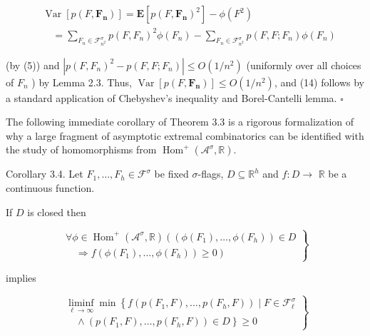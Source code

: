\documentclass[10pt]{article}
\begin{document}
$$
\begin{aligned}
& \operatorname{Var}\left[p\left(F, \boldsymbol{F}_{\boldsymbol{n}}\right)\right]=\mathbf{E}\left[p\left(F, \boldsymbol{F}_{\boldsymbol{n}}\right)^{2}\right]-\phi\left(F^{2}\right) \\
& \quad=\sum_{F_{n} \in \mathcal{F}_{n^{2}}^{\sigma}} p\left(F, F_{n}\right)^{2} \phi\left(F_{n}\right)-\sum_{F_{n} \in \mathcal{F}_{n^{2}}^{\sigma}} p\left(F, F ; F_{n}\right) \phi\left(F_{n}\right)
\end{aligned}
$$

(by (5)) and $\left|p\left(F, F_{n}\right)^{2}-p\left(F, F ; F_{n}\right)\right| \leq O\left(1 / n^{2}\right)$ (uniformly over all choices of $F_{n}$ ) by Lemma 2.3. Thus, $\operatorname{Var}\left[p\left(F, \boldsymbol{F}_{\boldsymbol{n}}\right)\right] \leq O\left(1 / n^{2}\right)$, and (14) follows by a standard application of Chebyshev's inequality and Borel-Cantelli lemma. \(\square\)

The following immediate corollary of Theorem 3.3 is a rigorous formalization of why a large fragment of asymptotic extremal combinatorics can be identified with the study of homomorphisms from $\operatorname{Hom}^{+}\left(\mathcal{A}^{\sigma}, \mathbb{R}\right)$.

Corollary 3.4. Let $F_{1}, \ldots, F_{h} \in \mathcal{F}^{\sigma}$ be fixed $\sigma$-flags, $D \subseteq \mathbb{R}^{h}$ and $f: D \longrightarrow$ $\mathbb{R}$ be a continuous function.

If $D$ is closed then

\[
\left.\begin{array}{l}
\forall \phi \in \operatorname{Hom}^{+}\left(\mathcal{A}^{\sigma}, \mathbb{R}\right)\left(\left(\phi\left(F_{1}\right), \ldots, \phi\left(F_{h}\right)\right) \in D\right.  \tag{15}\\
\left.\quad \Longrightarrow f\left(\phi\left(F_{1}\right), \ldots, \phi\left(F_{h}\right)\right) \geq 0\right)
\end{array}\right\}
\]

implies

\[
\left.\begin{array}{l}
\liminf _{\ell \rightarrow \infty} \min \left\{f\left(p\left(F_{1}, F\right), \ldots, p\left(F_{h}, F\right)\right) \mid F \in \mathcal{F}_{\ell}^{\sigma}\right.  \tag{16}\\
\left.\quad \wedge\left(p\left(F_{1}, F\right), \ldots, p\left(F_{h}, F\right)\right) \in D\right\} \geq 0
\end{array}\right\}
\]
\end{document}
